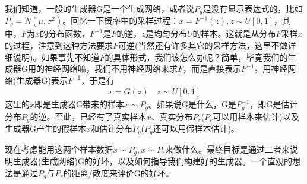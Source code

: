         \par
        我们知道，一般的生成器G是一个生成网络，或者说$P_g$是没有显示表达式的，比如$P_g = N(\mu,\sigma^2)$。回忆一下概率中的采样过程：$x = F^{-1}(z),z\sim U[0,1]$，其中，$F$为$x$的分布函数，$F^{-1}$是$F$的逆，$z$是均匀分布$U$的样本。这就是从分布$F$采样$x$的过程，注意到这种方法要求$F$可逆(当然还有许多其它的采样方法，这里不做详细说明)。如果事先不知道$F$的具体形式，我们该怎么办呢？简单，毕竟我们的生成器G用的神经网络嘛，我们不用神经网络来求$F$，而是直接表示$F^{-1}$。用神经网络(生成器G)表示$F^{-1}$，于是有
        \begin{align*}
        x = G(z)\quad z\sim U[0,1]
        \end{align*}
        这里的$x$即是生成器G带来的样本$x\sim P_g$。如果说G是什么，G是$P_g^{-1}$，即G是估计分布$P_g$的逆。至此，已经有了真实样本$x$、真实分布$P_r$($P_r$可以用样本来估计)以及生成器G产生的假样本$x$和估计分布$P_g$($P_g$还可以用假样本估计)。
        \par
        现在考虑能用这两个样本数据$x\sim P_g,x\sim P_r$来做什么。最终目标是通过二者来说明生成器(生成网络)G的好坏，以及如何指导我们构建好的生成器。一个直观的想法是通过$P_g$与$P_r$的距离/散度来评价G的好坏。
